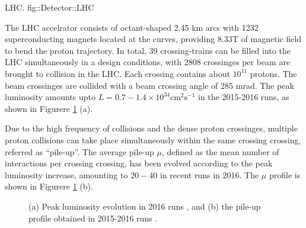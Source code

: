 {LHC. \cite{LHCPhoto}}
{fig::Detector::LHC}


The LHC accelrator consists of octant-shaped 2.45 km arcs with 1232 superconducting magnets located at the curves, providing 8.33T of magnetic field to bend the proton trajectory.
In total, 39 crossing-trains can be filled into the LHC simultaneously in a design conditions, with 2808 crossinges per beam are brought to collision in the LHC. Each crossing contains about $10^{11}$ protons. 
The beam crossinges are collided with a beam crossing angle of 285 mrad. 
The peak luminosity amounts upto $L = 0.7-1.4 \times 10^{34} \mathrm{cm}^{2} \mathrm{s}^{-1}$ in the 2015-2016 runs, as shown in Figurere \ref{fig::Detector::DAQ} (a).

Due to the high frequency of collisions and the dense proton crossinges, multiple proton collisions can take place simultaneously within the same crossing crossing, referred as ``pile-up''. 
The average pile-up $\mu$, defined as the mean number of interactions per crossing crossing,  
has been evolved according to the peak luminosity increase, amounting to $20-40$ in recent runs in 2016. The $\mu$ profile is shown in Figurere \ref{fig::Detector::DAQ} (b).

\begin{figure}[h]
  \centering
    \caption{  (a) Peak luminosity evolution in 2016 runs \cite{DAQ2016}, and (b) the pile-up profile obtained in 2015-2016 runs  \cite{lumiPubResult}.
      \label{fig::Detector::DAQ}
    }
\end{figure}



